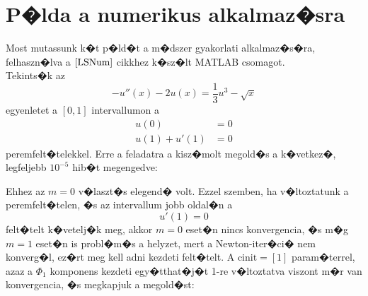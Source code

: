 \section{P�lda a numerikus alkalmaz�sra}
\label{sec:examples}

Most mutassunk k�t p�ld�t a m�dszer gyakorlati alkalmaz�s�ra, felhaszn�lva a $\cite{LSNum}$ cikkhez k�sz�lt MATLAB csomagot. \\
Tekints�k az
\begin{equation*}
-u''(x) - 2u(x) = \frac{1}{3} u^3 - \sqrt{x}
\end{equation*}
egyenletet a $[0, 1]$ intervallumon a
\begin{align*}
u(0) &= 0 \\
u(1) + u'(1) &= 0
\end{align*}
peremfelt�telekkel. Erre a feladatra a kisz�molt megold�s a k�vetkez�, legfeljebb $10^{-5}$ hib�t megengedve:
\begin{center}
\end{center}
Ehhez az $m = 0$ v�laszt�s elegend� volt. Ezzel szemben, ha v�ltoztatunk a peremfelt�telen, �s az intervallum jobb oldal�n a
\begin{equation*}
u'(1) = 0
\end{equation*}
felt�telt k�vetelj�k meg, akkor $m=0$ eset�n nincs konvergencia, �s m�g $m=1$ eset�n is probl�m�s a helyzet, mert a Newton-iter�ci� nem konverg�l, ez�rt meg kell adni kezdeti felt�telt. A
$\text{cinit} = [1]$ param�terrel, azaz a $\Phi_1$ komponens kezdeti egy�tthat�j�t 1-re v�ltoztatva viszont m�r van konvergencia, �s megkapjuk a megold�st:
\begin{center}
\end{center}

